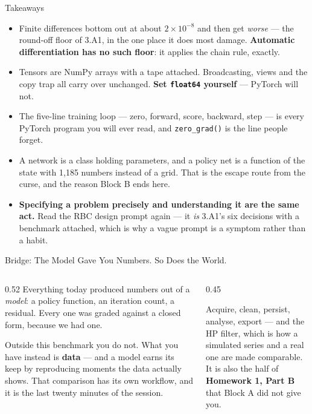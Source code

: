 \begin{frame}{Takeaways}
\begin{takeawaybox}
\begin{itemize}\small
  \item Finite differences bottom out at about $2\times10^{-8}$ and then get \emph{worse} --- the round-off floor of 3.A1, in the one place it does most damage. \textbf{Automatic differentiation has no such floor}: it applies the chain rule, exactly.
  \item Tensors are NumPy arrays with a tape attached. Broadcasting, views and the copy trap all carry over unchanged. \textbf{Set \texttt{float64} yourself} --- PyTorch will not.
  \item The five-line training loop --- zero, forward, score, backward, step --- is every PyTorch program you will ever read, and \texttt{zero\_grad()} is the line people forget.
  \item A network is a class holding parameters, and a policy net is a function of the state with 1{,}185 numbers instead of a grid. That is the escape route from the curse, and the reason Block B ends here.
  \item \textbf{Specifying a problem precisely and understanding it are the same act.} Read the RBC design prompt again --- it \emph{is} 3.A1's six decisions with a benchmark attached, which is why a vague prompt is a symptom rather than a habit.
\end{itemize}
\end{takeawaybox}
\end{frame}

\begin{frame}{Bridge: The Model Gave You Numbers. So Does the World.}
\begin{columns}[T]
\begin{column}{0.52\textwidth}
\small
Everything today produced numbers out of a \emph{model}: a policy function, an iteration count, a residual. Every one was graded against a closed form, because we had one.
\medskip

Outside this benchmark you do not. What you have instead is \textbf{data} --- and a model earns its keep by reproducing moments the data actually shows. That comparison has its own workflow, and it is the last twenty minutes of the session.
\end{column}
\begin{column}{0.45\textwidth}
\begin{conceptbox}[title=\textbf{Next (3.B4)}]\small
Acquire, clean, persist, analyse, export --- and the HP filter, which is how a simulated series and a real one are made comparable.\\[1mm]
It is also the half of \textbf{Homework 1, Part B} that Block A did not give you.
\end{conceptbox}
\end{column}
\end{columns}
\end{frame}


